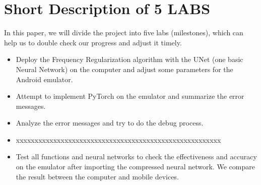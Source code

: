\documentclass{article}
\begin{document}
\section*{Short Description of 5 LABS}

In this paper, we will divide the project into five labs (milestones), which can help us to double check our progress and adjust it timely.

\begin{itemize}
	\item Deploy the Frequency Regularization algorithm with the UNet (one basic Neural Network) on the computer and adjust some parameters for the Android emulator. 
	
	\item Attempt to implement PyTorch on the emulator and summarize the error messages.
	
	\item Analyze the error messages and try to do the debug process. 
	
	\item xxxxxxxxxxxxxxxxxxxxxxxxxxxxxxxxxxxxxxxxxxxxxxxxxxxxxxx
	
	\item Test all functions and neural networks to check the effectiveness and accuracy on the emulator after importing the compressed neural network. We compare the result between the computer and mobile devices. 
	
\end{itemize}



\small

% 
  
\end{document}
